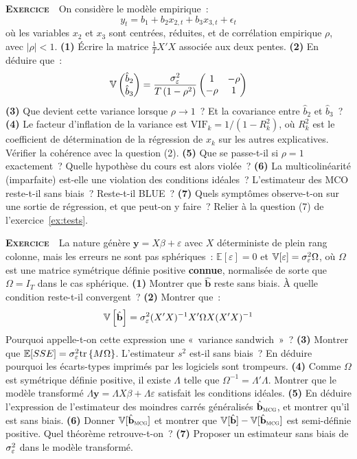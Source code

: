 \documentclass[10pt,a4paper,notitlepage]{article}
\newcounter{xnumber}
\newcommand{\exercice}{\refstepcounter{xnumber}\textsc{\textbf{Exercice}} \textbf{\thexnumber}\,\,}
\newcommand{\question}[1]{\textbf{(#1)}}
\begin{document}
\bigskip

\exercice\label{ex:multicolinearite} On considère le modèle empirique~:
\[
  y_t = b_1 + b_2 x_{2,t} + b_3 x_{3,t} + \epsilon_t
\]
où les variables $x_2$ et $x_3$ sont centrées, réduites, et de corrélation
empirique $\rho$, avec $|\rho|<1$. \question{1} Écrire la matrice
$\frac{1}{T}X'X$ associée aux deux pentes. \question{2} En déduire que~:
\[
  \mathbb V\begin{pmatrix}\hat b_2\\ \hat b_3\end{pmatrix}
  = \frac{\sigma_{\varepsilon}^2}{T\left(1-\rho^2\right)}
  \begin{pmatrix} 1 & -\rho\\ -\rho & 1\end{pmatrix}
\]
\question{3} Que devient cette variance lorsque $\rho \to 1$~? Et la covariance
entre $\hat b_2$ et $\hat b_3$~? \question{4} Le facteur d'inflation de la
variance est $\mathrm{VIF}_k = 1/(1-R_k^2)$, où $R_k^2$ est le coefficient de
détermination de la régression de $x_k$ sur les autres explicatives. Vérifier
la cohérence avec la question (2). \question{5} Que se passe-t-il si $\rho = 1$
exactement~? Quelle hypothèse du cours est alors violée~? \question{6} La
multicolinéarité (imparfaite) est-elle une violation des conditions idéales~?
L'estimateur des MCO reste-t-il sans biais~? Reste-t-il BLUE~? \question{7}
Quels symptômes observe-t-on sur une sortie de régression, et que peut-on y
faire~? Relier à la question (7) de l'exercice~\ref{ex:tests}.\newline

\bigskip

\exercice\label{ex:mcg} La nature génère $\mathbf y = X\beta + \varepsilon$ avec $X$
déterministe de plein rang colonne, mais les erreurs ne sont pas
sphériques~: $\mathbb E[\varepsilon] = 0$ et
$\mathbb V[\varepsilon] = \sigma_{\varepsilon}^2\Omega$, où $\Omega$ est une matrice symétrique
définie positive \textbf{connue}, normalisée de sorte que $\Omega = I_T$ dans le
cas sphérique. \question{1} Montrer que $\hat{\mathbf b}$ reste sans biais. À
quelle condition reste-t-il convergent~? \question{2} Montrer que~:
\[
  \mathbb V\left[\hat{\mathbf b}\right] = \sigma_{\varepsilon}^2 (X'X)^{-1}X'\Omega X (X'X)^{-1}
\]
Pourquoi appelle-t-on cette expression une «~variance sandwich~»~? \question{3}
Montrer que $\mathbb E[SSE] = \sigma_{\varepsilon}^2\mathrm{tr}\left\{M\Omega\right\}$. L'estimateur $s^2$
est-il sans biais~? En déduire pourquoi les écarts-types imprimés par les
logiciels sont trompeurs. \question{4} Comme $\Omega$ est symétrique définie
positive, il existe $\Lambda$ telle que $\Omega^{-1} = \Lambda'\Lambda$. Montrer
que le modèle transformé $\Lambda\mathbf y = \Lambda X\beta + \Lambda\varepsilon$
satisfait les conditions idéales. \question{5} En déduire l'expression de
l'estimateur des moindres carrés généralisés $\hat{\mathbf b}_{\textsc{mcg}}$,
et montrer qu'il est sans biais. \question{6} Donner
$\mathbb V[\hat{\mathbf b}_{\textsc{mcg}}]$ et montrer que
$\mathbb V[\hat{\mathbf b}]-\mathbb V[\hat{\mathbf b}_{\textsc{mcg}}]$ est
semi-définie positive. Quel théorème retrouve-t-on~? \question{7} Proposer un
estimateur sans biais de $\sigma_{\varepsilon}^2$ dans le modèle transformé.\newline
\end{document}
